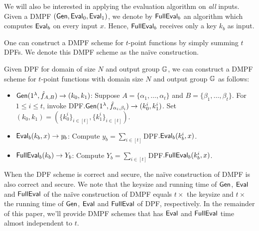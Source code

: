  We will also be interested in applying the evaluation algorithm on \emph{all} inputs. Given a DMPF $({\sf Gen},{\sf Eval}_0,{\sf Eval}_1)$, we denote by ${\sf FullEval}_b$ an algorithm which computes ${\sf Eval}_b$ on every input $x$. Hence, ${\sf FullEval}_b$ receives only a key $k_b$ as input.

 One can construct a DMPF scheme for $t$-point functions by simply summing $t$ DPFs. We denote this DMPF scheme as the na\"ive construction. 
\begin{construction}
  Given DPF for domain of size $N$ and output group $\mathbb{G}$, we can construct a DMPF scheme for $t$-point functions with domain size $N$ and output group $\mathbb{G}$ as follows: 
  \begin{itemize}
    \item ${\sf Gen}(1^\lambda, \hat{f}_{A, B})\rightarrow (k_0, k_1)$: Suppose $A = \{\alpha_1,\dots, \alpha_t\}$ and $B = \{\beta_1,\dots, \beta_t\}$. For $1\le i\le t$, invoke DPF$.{\sf Gen}(1^\lambda, \hat{f}_{\alpha_i, \beta_i})\rightarrow (k_0^i, k_1^i)$. Set $(k_0, k_1) = (\{k_0^i\}_{i\in [t]}, \{k_1^i\}_{i\in [t]})$. 
    \item ${\sf Eval}_b(k_b, x)\rightarrow y_b$: Compute $y_b = \sum_{i\in [t]}$DPF$.{\sf Eval}_b(k_b^i, x)$. 
    \item ${\sf FullEval}_b(k_b)\rightarrow Y_b$: Compute $Y_b = \sum_{i\in [t]}$DPF$.{\sf FullEval}_b(k_b^i, x)$. 
  \end{itemize}
\end{construction}
When the DPF scheme is correct and secure, the na\"ive construction of DMPF is also correct and secure. We note that the keysize and running time of ${\sf Gen}$, ${\sf Eval}$ and ${\sf FullEval}$ of the na\"ive construction of DMPF equals $t\times $ the keysize and $t\times$ the running time of ${\sf Gen}$, ${\sf Eval}$ and ${\sf FullEval}$ of DPF, respectively. In the remainder of this paper, we'll provide DMPF schemes that has ${\sf Eval}$ and ${\sf FullEval}$ time almost independent to $t$. 
 
 

